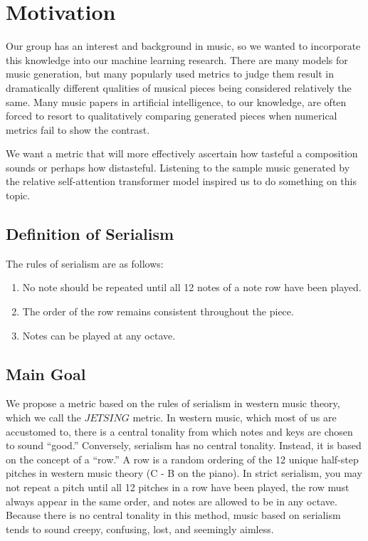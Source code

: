 \documentclass[11pt]{article}
\begin{document}
\section{Motivation}
Our group has an interest and background in music, so we wanted to incorporate this knowledge into our machine learning research.
There are many models for music generation, but many popularly used metrics to judge them result in dramatically different qualities of musical pieces being considered relatively the same.
Many music papers in artificial intelligence, to our knowledge, are often forced to resort to qualitatively comparing generated pieces when numerical metrics fail to show the contrast.

We want a metric that will more effectively ascertain how tasteful a composition sounds or perhaps how distasteful.
Listening to the sample music generated by the relative self-attention transformer model inspired us to do something on this topic.

\subsection{Definition of Serialism}
The rules of serialism are as follows:
\begin{enumerate}
    \item No note should be repeated until all 12 notes of a note row have been played.
    \item The order of the row remains consistent throughout the piece.
    \item Notes can be played at any octave.
\end{enumerate}

\subsection{Main Goal}
We propose a metric based on the rules of serialism in western music theory, which we call the $JETSING$ metric.
In western music, which most of us are accustomed to, there is a central tonality from which notes and keys are chosen to sound “good.”
Conversely, serialism has no central tonality. Instead, it is based on the concept of a “row.”
A row is a random ordering of the 12 unique half-step pitches in western music theory (C - B on the piano).
In strict serialism, you may not repeat a pitch until all 12 pitches in a row have been played, the row must always appear in the same order, and notes are allowed to be in any octave.
Because there is no central tonality in this method, music based on serialism tends to sound creepy, confusing, lost, and seemingly aimless.
\end{document}
